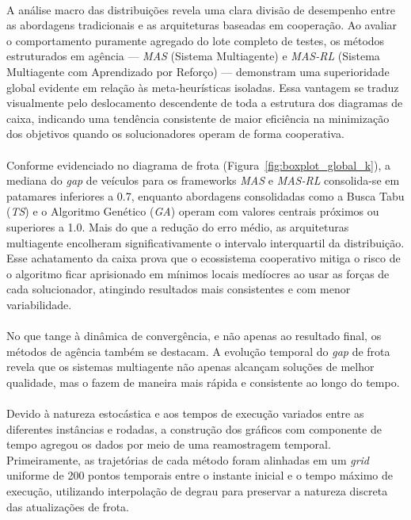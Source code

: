 \paragraph{}
A análise macro das distribuições revela uma clara divisão de desempenho entre as abordagens tradicionais e as arquiteturas baseadas em cooperação. Ao avaliar o comportamento puramente agregado do lote completo de testes, os métodos estruturados em agência — \textit{MAS} (Sistema Multiagente) e \textit{MAS-RL} (Sistema Multiagente com Aprendizado por Reforço) — demonstram uma superioridade global evidente em relação às meta-heurísticas isoladas. Essa vantagem se traduz visualmente pelo deslocamento descendente de toda a estrutura dos diagramas de caixa, indicando uma tendência consistente de maior eficiência na minimização dos objetivos quando os solucionadores operam de forma cooperativa.

\paragraph{}
Conforme evidenciado no diagrama de frota (Figura~\ref{fig:boxplot_global_k}), a mediana do \textit{gap} de veículos para os frameworks \textit{MAS} e \textit{MAS-RL} consolida-se em patamares inferiores a 0.7, enquanto abordagens consolidadas como a Busca Tabu (\textit{TS}) e o Algoritmo Genético (\textit{GA}) operam com valores centrais próximos ou superiores a 1.0. Mais do que a redução do erro médio, as arquiteturas multiagente encolheram significativamente o intervalo interquartil da distribuição. Esse achatamento da caixa prova que o ecossistema cooperativo mitiga o risco de o algoritmo ficar aprisionado em mínimos locais medíocres ao usar as forças de cada solucionador, atingindo resultados mais consistentes e com menor variabilidade.

\paragraph{} No que tange à dinâmica de convergência, e não apenas ao resultado final, os métodos de agência também se destacam. A evolução temporal do \textit{gap} de frota revela que os sistemas multiagente não apenas alcançam soluções de melhor qualidade, mas o fazem de maneira mais rápida e consistente ao longo do tempo.

\paragraph{} Devido à natureza estocástica e aos tempos de execução variados entre as diferentes instâncias e rodadas, a construção dos gráficos com componente de tempo agregou os dados por meio de uma reamostragem temporal. Primeiramente, as trajetórias de cada método foram alinhadas em um \textit{grid} uniforme de 200 pontos temporais entre o instante inicial e o tempo máximo de execução, utilizando interpolação de degrau para preservar a natureza discreta das atualizações de frota.

